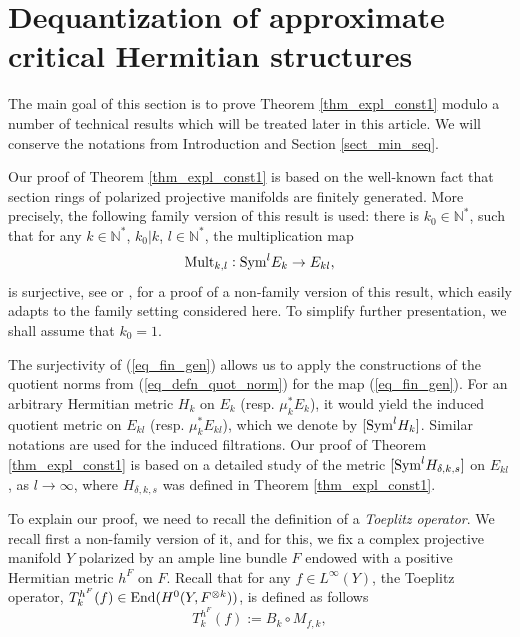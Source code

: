 \documentclass[12pt]{article}
\numberwithin{equation}{section}
\theoremstyle{theorem}
\theoremstyle{definition}
\theoremstyle{remark}
\newcommand{\nat}{\mathbb{N}}
\begin{document}
	\section{Dequantization of approximate critical Hermitian structures}\label{sect_dequant}
	The main goal of this section is to prove Theorem \ref{thm_expl_const1} modulo a number of technical results which will be treated later in this article.
	We will conserve the notations from Introduction and Section \ref{sect_min_seq}.
	\par 
	Our proof of Theorem \ref{thm_expl_const1} is based on the well-known fact that section rings of polarized projective manifolds are finitely generated. 
	More precisely, the following family version of this result is used: there is $k_0 \in \nat^*$, such that for any $k \in \nat^*$, $k_0 | k$, $l \in \nat^*$, the multiplication map 
	\begin{equation}\label{eq_fin_gen}
		{\rm{Mult}}_{k, l} : {\rm{Sym}}^l E_k \to E_{kl},
	\end{equation}
	is surjective, see \cite[Example 2.1.30]{LazarBookI} or \cite[Proposition 3.1]{FinSecRing}, for a proof of a non-family version of this result, which easily adapts to the family setting considered here.
	To simplify further presentation, we shall assume that $k_0 = 1$.
	\par 
	The surjectivity of (\ref{eq_fin_gen}) allows us to apply the constructions of the quotient norms from (\ref{eq_defn_quot_norm}) for the map (\ref{eq_fin_gen}).
	For an arbitrary Hermitian metric $H_k$ on $E_k$ (resp. $\mu_k^* E_k$), it would yield the induced quotient metric on $E_{kl}$ (resp. $\mu_k^* E_{kl}$), which we denote by $[{\rm{Sym}}^l H_k]$. 
	Similar notations are used for the induced filtrations.
	Our proof of Theorem \ref{thm_expl_const1} is based on a detailed study of the metric $[{\rm{Sym}}^l H_{\delta, k, s}]$ on $E_{kl}$, as $l \to \infty$, where $H_{\delta, k, s}$ was defined in Theorem \ref{thm_expl_const1}.
	\par 
	To explain our proof, we need to recall the definition of a \textit{Toeplitz operator}.
	We recall first a non-family version of it, and for this, we fix a complex projective manifold $Y$ polarized by an ample line bundle $F$ endowed with a positive Hermitian metric $h^F$ on $F$.
	Recall that for any $f \in L^{\infty}(Y)$, the Toeplitz operator, $T_k^{h^F}(f) \in {\rm{End}}(H^0(Y, F^{\otimes k}))$, is defined as follows 
	\begin{equation}\label{eq_defn_toepl}
		T_k^{h^F}(f) := B_k \circ M_{f, k},
	\end{equation}
\end{document}
